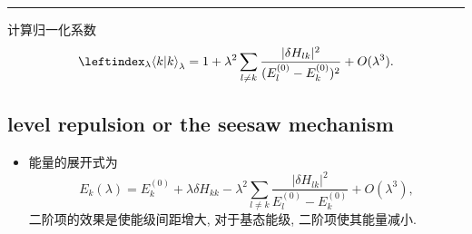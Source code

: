 \begin{itemize}
\begin{tcolorbox}[title=calculation:]
		\noindent\rule[0.5ex]{\linewidth}{0.5pt} %
		
		计算归一化系数
		\begin{equation}
			\leftindex_\lambda {\braket{k | k}}_\lambda = 1 + \lambda^2 \sum_{l \neq k} \frac{|\delta H_{l k}|^2}{(E_l^{(0)} - E_k^{(0)})^2} + O(\lambda^3).
		\end{equation}
	\end{tcolorbox}
\end{itemize}

\subsection{level repulsion or the seesaw mechanism} \label{subsection C.1.1}
\begin{itemize}
	\item 能量的展开式为
	\begin{equation}
		E_k(\lambda) = E_k^{(0)} + \lambda \delta H_{k k} - \lambda^2 \sum_{l \neq k} \frac{|\delta H_{l k}|^2}{E_l^{(0)} - E_k^{(0)}} + O(\lambda^3),
	\end{equation}
	二阶项的效果是使能级间距增大, 对于基态能级, 二阶项使其能量减小.
\end{itemize}

